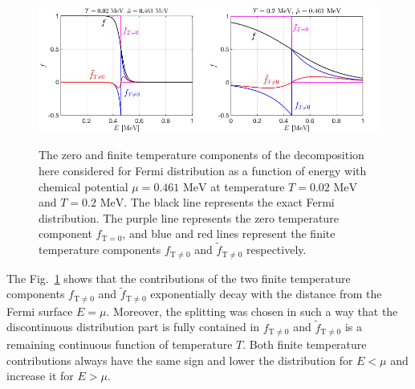 \documentclass[sn-mathphys,Numbered]{sn-jnl}
\newcommand*{\MeV}{\text{ MeV}}
\newcommand{\rev}[1]{{\color{blue}#1}}
\begin{document}
\begin{figure}[ht]
\centering
\includegraphics[width=0.5\textwidth]{./plot/FermiZeorFiniteTemperature}\includegraphics[width=0.5\textwidth]{./plot/FermiZeroFiniteTemperature002}
\caption{%
The zero and finite temperature components of the decomposition here considered for Fermi distribution as a function of energy with chemical potential $\mu=0.461\MeV$ at temperature $T=0.02\MeV$ and $T=0.2\MeV$. The black line represents the exact Fermi distribution. The purple line represents the zero temperature component $f_{\mathrm{T}=0}$, and blue and red lines represent the finite temperature components $f_\mathrm{T\neq0}$ and $\widetilde f_\mathrm{T\neq0}$ respectively. }
\label{Fermi_Component}
\end{figure}

The Fig.~\ref{Fermi_Component} shows that the contributions of the two finite temperature components $f_\mathrm{T\neq0}$ and $\widetilde f_\mathrm{T\neq0}$ exponentially decay with the distance from the Fermi surface $E=\mu$. Moreover, the splitting was chosen in such a way that the discontinuous distribution part is fully contained in $f_\mathrm{T\neq 0}$ and $\widetilde{f}_\mathrm{T\neq 0}$ is a remaining continuous function of temperature $T$.  Both finite temperature contributions always have the same sign and lower the distribution for $E < \mu$ and increase it for $E > \mu$.
\end{document}
